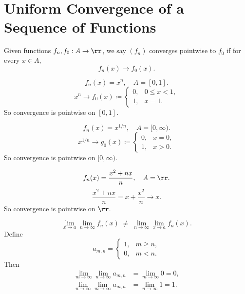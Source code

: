 
\section{Uniform Convergence of a Sequence of Functions}


\begin{definition}
    Given functions $f_n, f_0 : A\to\rr$, we say $(f_n)$ converges pointwise to $f_0$ if for every $x\in A$,
    \[
        f_n(x)\to f_0(x).
    \]
\end{definition}

\begin{problem}{
    \[
        f_n(x) = x^n, \quad A = [0,1].
    \]
}
    \[
        x^n \to f_0(x) \coloneqq
        \begin{cases}
            0, & 0 \leq x < 1,\\
            1, & x = 1.
        \end{cases}
    \]
    So convergence is pointwise on $[0,1]$.
\end{problem}

\begin{problem}{
    \[
        f_n(x) = x^{1/n}, \quad A = [0,\infty).
    \]
}
    \[
        x^{1/n} \to g_0(x) \coloneqq
        \begin{cases}
            0, & x = 0,\\
            1, & x > 0.
        \end{cases}
    \]
    So convergence is pointwise on $[0,\infty)$.
\end{problem}

\begin{problem}{
    \[
        f_n(x) = \dfrac{x^2 + nx}{n}, \quad A = \rr.
    \]
}
    \[
        \dfrac{x^2 + nx}{n} = x + \dfrac{x^2}{n} \to x.
    \]
    So convergence is pointwise on $\rr$.
\end{problem}

\begin{problem}{
    \[
        \lim_{x\to a}\lim_{n\to\infty} f_n(x)
        \;\not=\;
        \lim_{n\to\infty}\lim_{x\to a} f_n(x).
    \]
}
    Define
    \[
        a_{m,n} =
        \begin{cases}
            1, & m \geq n,\\
            0, & m < n.
        \end{cases}
    \]
    Then
    \begin{align*}
        \lim_{m\to\infty}\lim_{n\to\infty} a_{m,n} &= \lim_{m\to\infty} 0 = 0,\\
        \lim_{n\to\infty}\lim_{m\to\infty} a_{m,n} &= \lim_{n\to\infty} 1 = 1.
    \end{align*}
\end{problem}

